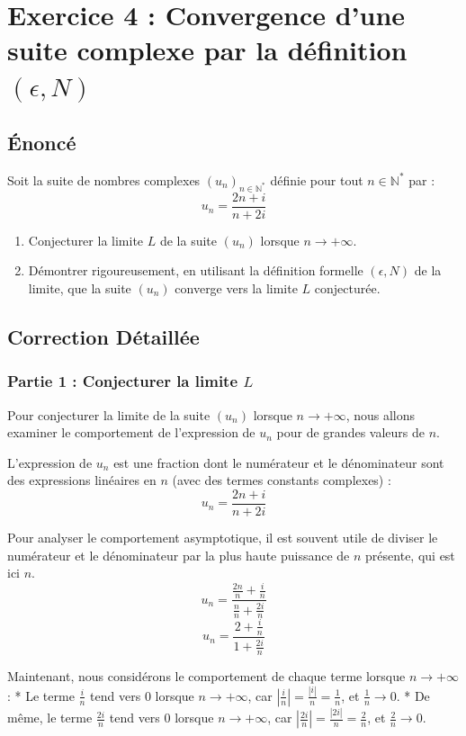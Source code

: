 \documentclass[a4paper,11pt]{report}
\begin{document}
\section*{Exercice 4 : Convergence d'une suite complexe par la définition $(\epsilon, N)$}
\subsection*{Énoncé}
Soit la suite de nombres complexes $(u_n)_{n \in \mathbb{N}^*}$ définie pour tout $n \in \mathbb{N}^*$ par :
$$u_n = \frac{2n+i}{n+2i}$$
\begin{enumerate}
\item Conjecturer la limite $L$ de la suite $(u_n)$ lorsque $n \to +\infty$.

\item Démontrer rigoureusement, en utilisant la définition formelle $(\epsilon, N)$ de la limite, que la suite $(u_n)$ converge vers la limite $L$ conjecturée.
\end{enumerate}

\subsection*{Correction Détaillée}

\subsubsection*{Partie 1 : Conjecturer la limite $L$}

Pour conjecturer la limite de la suite $(u_n)$ lorsque $n \to +\infty$, nous allons examiner le comportement de l'expression de $u_n$ pour de grandes valeurs de $n$.

L'expression de $u_n$ est une fraction dont le numérateur et le dénominateur sont des expressions linéaires en $n$ (avec des termes constants complexes) :
$$u_n = \frac{2n+i}{n+2i}$$

Pour analyser le comportement asymptotique, il est souvent utile de diviser le numérateur et le dénominateur par la plus haute puissance de $n$ présente, qui est ici $n$.
$$u_n = \frac{\frac{2n}{n} + \frac{i}{n}}{\frac{n}{n} + \frac{2i}{n}}$$
$$u_n = \frac{2 + \frac{i}{n}}{1 + \frac{2i}{n}}$$

Maintenant, nous considérons le comportement de chaque terme lorsque $n \to +\infty$ :
*   Le terme $\frac{i}{n}$ tend vers $0$ lorsque $n \to +\infty$, car $| \frac{i}{n} | = \frac{|i|}{n} = \frac{1}{n}$, et $\frac{1}{n} \to 0$.
*   De même, le terme $\frac{2i}{n}$ tend vers $0$ lorsque $n \to +\infty$, car $| \frac{2i}{n} | = \frac{|2i|}{n} = \frac{2}{n}$, et $\frac{2}{n} \to 0$.
\end{document}
